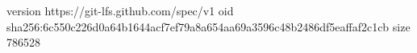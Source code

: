 version https://git-lfs.github.com/spec/v1
oid sha256:6c550c226d0a64b1644acf7ef79a8a654aa69a3596c48b2486df5eaffaf2c1cb
size 786528
